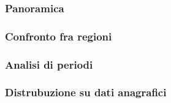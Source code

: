 \subsubsection{Panoramica}\label{ss:panoramica}


\subsubsection{Confronto fra regioni}\label{ss:confronto-fra-regioni}

\subsubsection{Analisi di periodi}\label{ss:analisi-di-periodi}

\subsubsection{Distrubuzione su dati anagrafici}\label{ss:distribuzione-su-dati-anagrafici}
